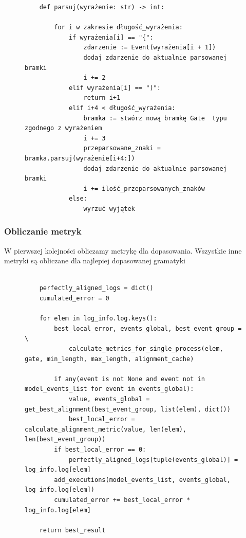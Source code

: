 \begin{figure}[!ht]
\lstset{caption=Parser gramatyki, captionpos=b}
\lstset{label=src:passive, frame=single}
\begin{lstlisting}
    def parsuj(wyrażenie: str) -> int:

        for i w zakresie długość_wyrażenia:
            if wyrażenia[i] == "{":
                zdarzenie := Event(wyrażenia[i + 1])
                dodaj zdarzenie do aktualnie parsowanej bramki 
                i += 2
            elif wyrażenia[i] == ")":
                return i+1
            elif i+4 < długość_wyrażenia:
                bramka := stwórz nową bramkę Gate  typu zgodnego z wyrażeniem 
                i += 3
                przeparsowane_znaki = bramka.parsuj(wyrażenie[i+4:])
                dodaj zdarzenie do aktualnie parsowanej bramki 
                i += ilość_przeparsowanych_znaków
            else:
                wyrzuć wyjątek
\end{lstlisting}
\end{figure}

\subsubsection{Obliczanie metryk}

W pierwszej kolejności obliczamy metrykę dla dopasowania. Wszystkie inne metryki są obliczane dla najlepiej dopasowanej gramatyki 
\begin{figure}[!ht]
\lstset{caption=Obliczanie metryk, captionpos=b}
\lstset{label=src:best_result, frame=single}
\begin{lstlisting}

    perfectly_aligned_logs = dict()
    cumulated_error = 0

    for elem in log_info.log.keys():
        best_local_error, events_global, best_event_group = \
            calculate_metrics_for_single_process(elem, gate, min_length, max_length, alignment_cache)

        if any(event is not None and event not in model_events_list for event in events_global):
            value, events_global = get_best_alignment(best_event_group, list(elem), dict())
            best_local_error = calculate_alignment_metric(value, len(elem), len(best_event_group))
        if best_local_error == 0:
            perfectly_aligned_logs[tuple(events_global)] = log_info.log[elem]
        add_executions(model_events_list, events_global, log_info.log[elem])
        cumulated_error += best_local_error * log_info.log[elem]

    return best_result
\end{lstlisting}
\end{figure}

